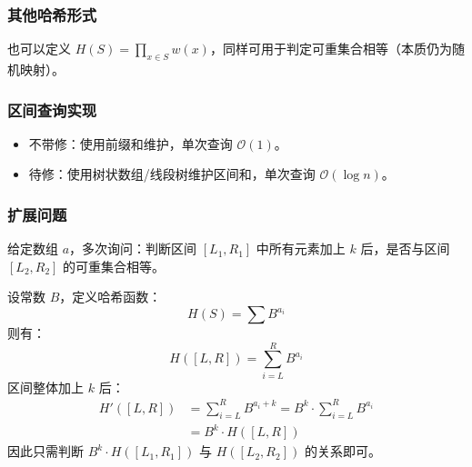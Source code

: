\documentclass[11pt,a4paper,twocolumn]{ctexart}  %
\begin{document}
\subsubsection*{其他哈希形式}
也可以定义 $H(S)=\prod_{x\in S} w(x)$，同样可用于判定可重集合相等（本质仍为随机映射）。

\subsubsection*{区间查询实现}
\begin{itemize}
    \item 不带修：使用前缀和维护，单次查询 $\mathcal{O}(1)$。
    \item 待修：使用树状数组/线段树维护区间和，单次查询 $\mathcal{O}(\log n)$。
\end{itemize}

\subsubsection*{扩展问题}
给定数组 $a$，多次询问：判断区间 $[L_1,R_1]$ 中所有元素加上 $k$ 后，是否与区间 $[L_2,R_2]$ 的可重集合相等。

设常数 $B$，定义哈希函数：
\[
H(S)=\sum B^{a_i}
\]
则有：
\[
H([L,R])=\sum_{i=L}^{R} B^{a_i}
\]
区间整体加上 $k$ 后：
\[
\begin{aligned}
H'([L,R]) &= \sum_{i=L}^{R} B^{a_i+k} = B^k\cdot\sum_{i=L}^{R} B^{a_i} \\
          &= B^k\cdot H([L,R])
\end{aligned}
\]
因此只需判断 $B^k\cdot H([L_1,R_1])$ 与 $H([L_2,R_2])$ 的关系即可。
\end{document}
